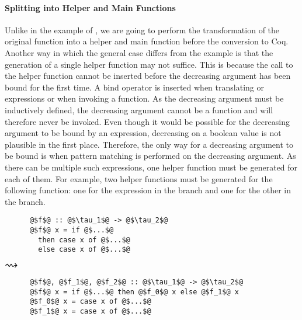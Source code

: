 \paragraph{Splitting into Helper and Main Functions}
Unlike in the example of , we are going to perform the transformation of the original function into a helper and main function before the conversion to Coq.
Another way in which the general case differs from the example is that the generation of a single helper function may not suffice.
This is because the call to the helper function cannot be inserted before the decreasing argument has been bound for the first time.
A bind operator is inserted when translating  or  expressions or when invoking a function.
As the decreasing argument must be inductively defined, the decreasing argument cannot be a function and will therefore never be invoked.
Even though it would be possible for the decreasing argument to be bound by an  expression, decreasing on a boolean value is not plausible in the first place.
Therefore, the only way for a decreasing argument to be bound is when pattern matching is performed on the decreasing argument.
As there can be multiple such  expressions, one helper function must be generated for each of them.
For example, two helper functions must be generated for the following function: one for the  expression in the  branch and one for the other in the  branch.

\begin{center}
  \begin{minipage}[t]{0.3\textwidth}
    \begin{verbatim}
      @$f$@ :: @$\tau_1$@ -> @$\tau_2$@
      @$f$@ x = if @$...$@
        then case x of @$...$@
        else case x of @$...$@
    \end{verbatim}
  \end{minipage}
  \begin{minipage}[c]{0.1\textwidth}
    $\mathlarger{\mathlarger{\mathlarger{\rightsquigarrow}}}$
  \end{minipage}
  \begin{minipage}[t]{0.35\textwidth}
    \begin{verbatim}
      @$f$@, @$f_1$@, @$f_2$@ :: @$\tau_1$@ -> @$\tau_2$@
      @$f$@ x = if @$...$@ then @$f_0$@ x else @$f_1$@ x
      @$f_0$@ x = case x of @$...$@
      @$f_1$@ x = case x of @$...$@
    \end{verbatim}
  \end{minipage}
\end{center}

